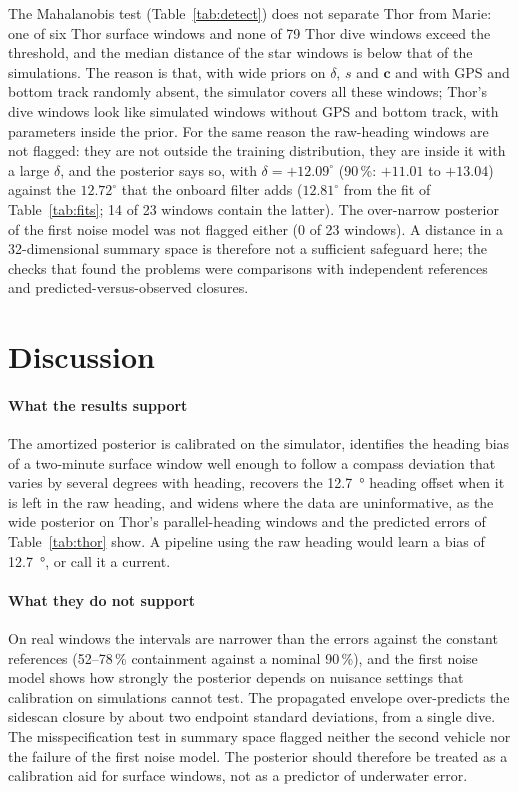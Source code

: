 \documentclass[conference]{IEEEtran}
\newcommand{\vect}[1]{\boldsymbol{#1}}
\begin{document}
The Mahalanobis test (Table~\ref{tab:detect}) does not separate Thor from Marie: one of six Thor surface windows and none of 79 Thor dive windows exceed the threshold, and the median distance of the star windows is below that of the simulations. The reason is that, with wide priors on $\delta$, $s$ and $\vect{c}$ and with GPS and bottom track randomly absent, the simulator covers all these windows; Thor's dive windows look like simulated windows without GPS and bottom track, with parameters inside the prior. For the same reason the raw-heading windows are not flagged: they are not outside the training distribution, they are inside it with a large $\delta$, and the posterior says so, with $\delta = +12.09^{\circ}$ (90\,\%: $+11.01$ to $+13.04$) against the $12.72^{\circ}$ that the onboard filter adds ($12.81^{\circ}$ from the fit of Table~\ref{tab:fits}; 14 of 23 windows contain the latter). The over-narrow posterior of the first noise model was not flagged either (0 of 23 windows). A distance in a 32-dimensional summary space is therefore not a sufficient safeguard here; the checks that found the problems were comparisons with independent references and predicted-versus-observed closures.



\section{Discussion}

\paragraph{What the results support} The amortized posterior is calibrated on the simulator, identifies the heading bias of a two-minute surface window well enough to follow a compass deviation that varies by several degrees with heading, recovers the \SI{12.7}{\degree} heading offset when it is left in the raw heading, and widens where the data are uninformative, as the wide posterior on Thor's parallel-heading windows and the predicted errors of Table~\ref{tab:thor} show. A pipeline using the raw heading would learn a bias of \SI{12.7}{\degree}, or call it a current.

\paragraph{What they do not support} On real windows the intervals are narrower than the errors against the constant references (52--78\,\% containment against a nominal 90\,\%), and the first noise model shows how strongly the posterior depends on nuisance settings that calibration on simulations cannot test. The propagated envelope over-predicts the sidescan closure by about two endpoint standard deviations, from a single dive. The misspecification test in summary space flagged neither the second vehicle nor the failure of the first noise model. The posterior should therefore be treated as a calibration aid for surface windows, not as a predictor of underwater error.
\end{document}
